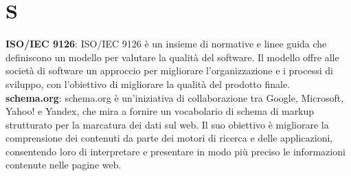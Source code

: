 \section{S}
\textbf{ISO/IEC 9126}: ISO/IEC 9126 è un insieme di normative e linee guida che definiscono un modello per valutare la qualità del software. Il modello offre alle società di software un approccio per migliorare l'organizzazione e i processi di sviluppo, con l'obiettivo di migliorare la qualità del prodotto finale.\\
\textbf{schema.org}: schema.org è un'iniziativa di collaborazione tra Google, Microsoft, Yahoo! e Yandex, che mira a fornire un vocabolario di schema di markup strutturato per la marcatura dei dati sul web. Il suo obiettivo è migliorare la comprensione dei contenuti da parte dei motori di ricerca e delle applicazioni, consentendo loro di interpretare e presentare in modo più preciso le informazioni contenute nelle pagine web.